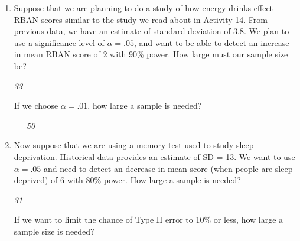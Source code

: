 \begin{enumerate}
\begin{key}
  {\it     It would increase (power and significance level change in the
    same direction). }
\end{key}

\begin{center}
  {\bf Planning a new study}
\end{center}
  \item   Suppose that we are planning to do a study of how energy
    drinks effect RBAN scores similar to the study we read about in
    Activity 14.  From previous data, we have an estimate of standard
    deviation of 3.8. We plan to use a significance level of $\alpha =
    .05$, and want to be able to detect an increase in mean RBAN score
    of 2 with 90\% power.   How large must our sample size be?
\begin{students}
 \vspace{1cm} %
\end{students}

\begin{key}
  {\it  33}
\end{key}


      If we choose $\alpha = .01$, how large a sample is needed?
\begin{students}
 \vspace{1cm}
\end{students}
\begin{key}
\ \ \   {\it 50}
\end{key}

  \item  Now suppose that we are using a memory test used to study
    sleep deprivation.  Historical data 
    provides an estimate of SD = 13.  We want to use $\alpha = .05$ and
    need to detect an decrease in mean score (when people are sleep
    deprived) of 6 with 80\% power.  
    How large a sample is needed? 
\begin{students}
 \vspace{1cm} %
\end{students}

\begin{key}
  {\it  31}
\end{key}


    If we want to limit the chance of Type II error to 10\% or less,
    how large a sample size is needed? 
\begin{students}
 \vspace{1cm}\\
\end{students}


\end{enumerate}
